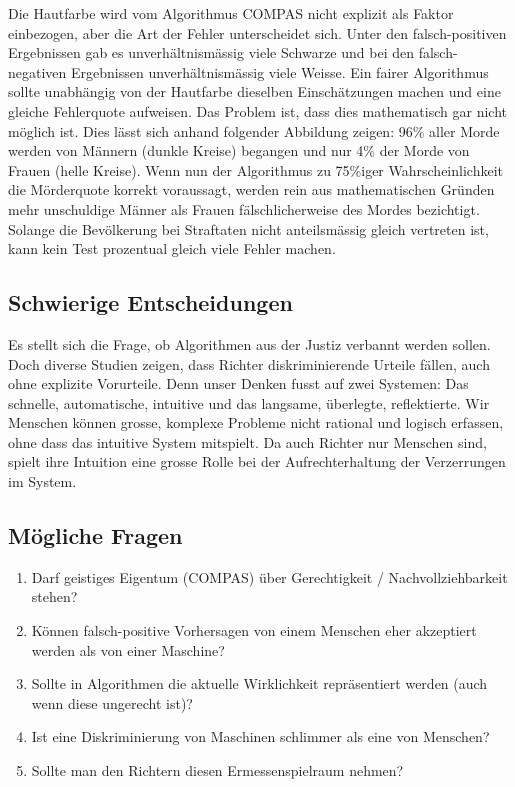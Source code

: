 \documentclass{article}
\begin{document}
Die Hautfarbe wird vom Algorithmus COMPAS nicht explizit als Faktor einbezogen, aber die Art der Fehler unterscheidet sich. Unter den falsch-positiven Ergebnissen gab es unverhältnismässig viele Schwarze und bei den falsch-negativen Ergebnissen unverhältnismässig viele Weisse. Ein fairer Algorithmus sollte unabhängig von der Hautfarbe dieselben Einschätzungen machen und eine gleiche Fehlerquote aufweisen. Das Problem ist, dass dies mathematisch gar nicht möglich ist. Dies lässt sich anhand folgender Abbildung zeigen: 96\% aller Morde werden von Männern (dunkle Kreise) begangen und nur 4\% der Morde von Frauen (helle Kreise). Wenn nun der Algorithmus zu 75\%iger Wahrscheinlichkeit die Mörderquote korrekt voraussagt, werden rein aus mathematischen Gründen mehr unschuldige Männer als Frauen fälschlicherweise des Mordes bezichtigt. Solange die Bevölkerung bei Straftaten nicht anteilsmässig gleich vertreten ist, kann kein Test prozentual gleich viele Fehler machen.  

\subsection*{Schwierige Entscheidungen}

Es stellt sich die Frage, ob Algorithmen aus der Justiz verbannt werden sollen. Doch diverse Studien zeigen, dass Richter diskriminierende Urteile fällen, auch ohne explizite Vorurteile. Denn unser Denken fusst auf zwei Systemen: Das schnelle, automatische, intuitive und das langsame, überlegte, reflektierte. Wir Menschen können grosse, komplexe Probleme nicht rational und logisch erfassen, ohne dass das intuitive System mitspielt. Da auch Richter nur Menschen sind, spielt ihre Intuition eine grosse Rolle bei der Aufrechterhaltung der Verzerrungen im System.  

\newpage

\subsection*{Mögliche Fragen} 
		\begin{enumerate}
			\item Darf geistiges Eigentum (COMPAS) über Gerechtigkeit / Nachvollziehbarkeit stehen? 
			\item Können falsch-positive Vorhersagen von einem Menschen eher 
						akzeptiert werden als von einer Maschine? 
			\item Sollte in Algorithmen die aktuelle Wirklichkeit repräsentiert 
						werden (auch wenn diese ungerecht ist)? 
			\item Ist eine Diskriminierung von Maschinen schlimmer als eine von Menschen? 
			\item Sollte man den Richtern diesen Ermessenspielraum nehmen? 
\end{enumerate}
 
	
\end{document}
